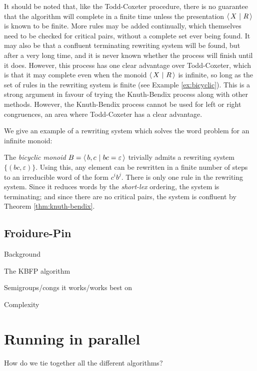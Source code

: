It should be noted that, like the
Todd-Coxeter procedure, there is no guarantee that the algorithm will complete
in a finite time unless the presentation $\left\langle\,X ~\middle|~ R\,\right\rangle$ is known to be finite.
More rules may be added continually, which themselves need to
be checked for critical pairs, without a complete set ever being found.  It may
also be that a confluent terminating rewriting system will be found, but after a
very long time, and it is never known whether the process will finish until it
does.  However, this process has one clear advantage over Todd-Coxeter, which is
that it may complete even when the monoid $\left\langle\,X ~\middle|~ R\,\right\rangle$ is infinite, so long as
the set of rules in the rewriting system is finite
(see Example \ref{ex:bicyclic}).  This is a strong argument
in favour of trying the Knuth-Bendix process along with other methods.  However,
the Knuth-Bendix process cannot be used for left or right congruences, an area
where Todd-Coxeter has a clear advantage.

We give an example of a rewriting system which solves the word problem for an
infinite monoid:

\begin{example}
  \label{ex:bicyclic}
  The \textit{bicyclic monoid} $B = \left\langle\,b,c ~\middle|~ bc=\varepsilon\,\right\rangle$ trivially admits
  a rewriting system $\{(bc, \varepsilon)\}$.  Using this, any element can be
  rewritten in a finite number of steps to an irreducible word of the form
  $c^ib^j$.  There is only one rule in the rewriting system.  Since it reduces
  words by the \textit{short-lex} ordering, the system is terminating; and since
  there are no critical pairs, the system is confluent by Theorem
  \ref{thm:knuth-bendix}.
\end{example}

\clearpage

\subsection{Froidure-Pin}
\label{sec:fp}

Background

The KBFP algorithm

Semigroups/congs it works/works best on

Complexity

\section{Running in parallel}

How do we tie together all the different algorithms?

